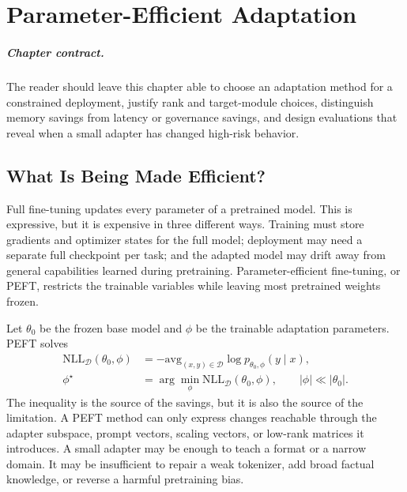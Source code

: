\chapter{Parameter-Efficient Adaptation}
\label{ch:parameter-efficient-adaptation}


\paragraph{Chapter contract.} The reader should leave this chapter able to choose an adaptation method for a constrained deployment, justify rank and target-module choices, distinguish memory savings from latency or governance savings, and design evaluations that reveal when a small adapter has changed high-risk behavior.

\section{What Is Being Made Efficient?}
\label{sec:peft-efficiency-target}

Full fine-tuning updates every parameter of a pretrained model. This is expressive, but it is expensive in three different ways. Training must store gradients and optimizer states for the full model; deployment may need a separate full checkpoint per task; and the adapted model may drift away from general capabilities learned during pretraining. Parameter-efficient fine-tuning, or PEFT, restricts the trainable variables while leaving most pretrained weights frozen.

Let $\theta_0$ be the frozen base model and $\phi$ be the trainable adaptation parameters. PEFT solves
\begin{equation}
  \begin{aligned}
  \mathrm{NLL}_{\mathcal{D}}(\theta_0,\phi)
    &= -\mathrm{avg}_{(x,y)\in \mathcal{D}}
       \log p_{\theta_0,\phi}(y \mid x),\\
  \phi^{\star}
    &= \arg\min_{\phi}\mathrm{NLL}_{\mathcal{D}}(\theta_0,\phi),
       \qquad |\phi| \ll |\theta_0|.
  \end{aligned}
  \label{eq:peft-objective}
\end{equation}
The inequality is the source of the savings, but it is also the source of the limitation. A PEFT method can only express changes reachable through the adapter subspace, prompt vectors, scaling vectors, or low-rank matrices it introduces. A small adapter may be enough to teach a format or a narrow domain. It may be insufficient to repair a weak tokenizer, add broad factual knowledge, or reverse a harmful pretraining bias.


